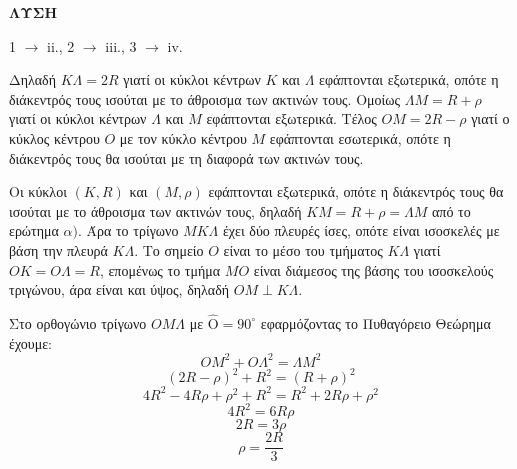 \textbf{ΛΥΣΗ}

\begin{alist}
    \item %
    1 $\rightarrow$ ii., 2 $\rightarrow$ iii., 3 $\rightarrow$ iv.

    Δηλαδή $K\Lambda = 2R$ γιατί οι κύκλοι κέντρων $K$ και $\Lambda$ εφάπτονται εξωτερικά, οπότε η διάκεντρός τους ισούται με το άθροισμα των ακτινών τους. Ομοίως $\Lambda M = R+\rho$ γιατί οι κύκλοι κέντρων $\Lambda$ και $M$ εφάπτονται εξωτερικά. Τέλος $OM = 2R-\rho$ γιατί ο κύκλος κέντρου $O$ με τον κύκλο κέντρου $M$ εφάπτονται εσωτερικά, οπότε η διάκεντρός τους θα ισούται με τη διαφορά των ακτινών τους.

    \item %
    \begin{rlist}
        \item Οι κύκλοι $(K,R)$ και $(M,\rho)$ εφάπτονται εξωτερικά, οπότε η διάκεντρός τους θα ισούται με το άθροισμα των ακτινών τους, δηλαδή $KM = R+\rho = \Lambda M$ από το ερώτημα $\alpha)$. Άρα το τρίγωνο $MK\Lambda$ έχει δύο πλευρές ίσες, οπότε είναι ισοσκελές με βάση την πλευρά $K\Lambda$. Το σημείο $O$ είναι το μέσο του τμήματος $K\Lambda$ γιατί $OK=O\Lambda=R$, επομένως το τμήμα $MO$ είναι διάμεσος της βάσης του ισοσκελούς τριγώνου, άρα είναι και ύψος, δηλαδή $OM \perp K\Lambda$.

        \item Στο ορθογώνιο τρίγωνο $OM\Lambda$ με $\hat{\text{O}} = 90^\circ$ εφαρμόζοντας το Πυθαγόρειο Θεώρημα έχουμε:
        \[ OM^2 + O\Lambda^2 = \Lambda M^2 \]
        \[ (2R-\rho)^2 + R^2 = (R+\rho)^2 \]
        \[ 4R^2 - 4R\rho + \rho^2 + R^2 = R^2 + 2R\rho + \rho^2 \]
        \[ 4R^2 = 6R\rho \]
        \[ 2R = 3\rho \]
        \[ \rho = \frac{2R}{3} \]
    \end{rlist}
\end{alist}